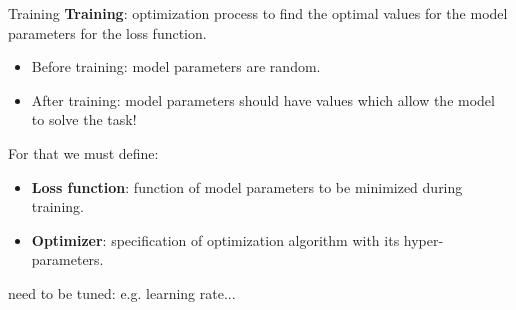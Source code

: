 % 

\begin{frame}{Training}
\textbf{Training}: optimization process to find the optimal values for the model parameters for the loss function.
\begin{itemize}
\item Before training: model parameters are random. 
\item After training: model parameters should have values which allow the model to solve the task!
\end{itemize}
\vsp
For that we must define:
\begin{itemize}
\item \textbf{Loss function}: function of model parameters to be minimized during training.
\item \textbf{Optimizer}:
specification of optimization algorithm with its hyper-parameters.
\end{itemize}
\vsp
{} need to be tuned: e.g. learning rate...
\end{frame}

